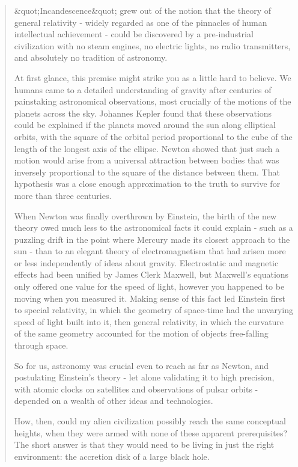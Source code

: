 \begin{quote}
  &quot;Incandescence&quot; grew out of the notion that the theory of general 
  relativity - widely regarded as one of the pinnacles of human 
  intellectual achievement - could be discovered by a pre-industrial 
  civilization with no steam engines, no electric lights, no radio 
  transmitters, and absolutely no tradition of astronomy.

  At first glance, this premise might strike you as a little hard 
  to believe.  We humans came to a detailed understanding of gravity 
  after centuries of painstaking astronomical observations, most 
  crucially of the motions of the planets across the sky.  Johannes 
  Kepler found that these observations could be explained if the 
  planets moved around the sun along elliptical orbits, with the 
  square of the orbital period proportional to the cube of the 
  length of the longest axis of the ellipse.  Newton showed 
  that just such a motion would arise from a universal attraction 
  between bodies that was inversely proportional to the square of 
  the distance between them.  That hypothesis was a close enough 
  approximation to the truth to survive for more than three centuries.

  When Newton was finally overthrown by Einstein, the birth of the 
  new theory owed much less to the astronomical facts it could explain -
  such as a puzzling drift in the point where Mercury made its closest 
  approach to the sun - than to an elegant theory of electromagnetism 
  that had arisen more or less independently of ideas about gravity. 
  Electrostatic and magnetic effects had been unified by James Clerk 
  Maxwell, but Maxwell's equations only offered one value for the speed 
  of light, however you happened to be moving when you measured it. 
  Making sense of this fact led Einstein first to special relativity, 
  in which the geometry of space-time had the unvarying speed of light 
  built into it, then general relativity, in which the curvature of the 
  same geometry accounted for the motion of objects free-falling 
  through space.

  So for us, astronomy was crucial even to reach as far as Newton, and 
  postulating Einstein's theory - let alone validating it to high 
  precision, with atomic clocks on satellites and observations of 
  pulsar orbits - depended on a wealth of other ideas and technologies.
 
  How, then, could my alien civilization possibly reach the same 
  conceptual heights, when they were armed with none of these apparent 
  prerequisites?   The short answer is that they would need to be 
  living in just the right environment: the accretion disk of a large 
  black hole.


\end{quote}
